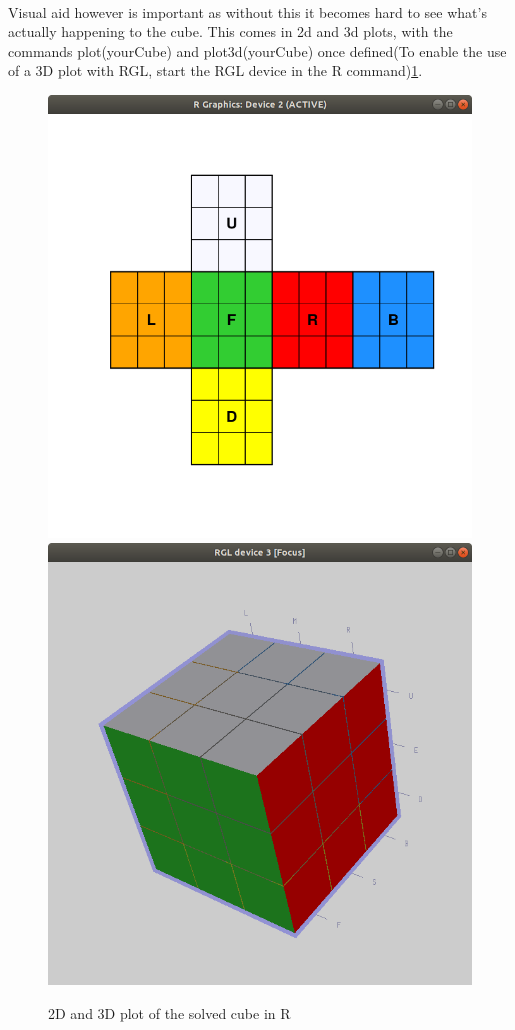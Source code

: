 \documentclass{article}
\begin{document}
\paragraph{}
Visual aid however is important as without this it becomes hard to see what's actually happening to the cube. This comes in 2d and 3d plots, with the commands plot(yourCube) and plot3d(yourCube) once defined(To enable the use of a 3D plot with RGL, start the RGL device in the R command)\ref{fig:2d&3d}.
\newpage
\begin{figure}
	\centering
	\includegraphics[scale=.4]{2dcube.png}
    \includegraphics[scale=.4]{3dcube.png}
    \label{fig:2d&3d}
    \caption{2D and 3D plot of the solved cube in R}
\end{figure}
\end{document}
